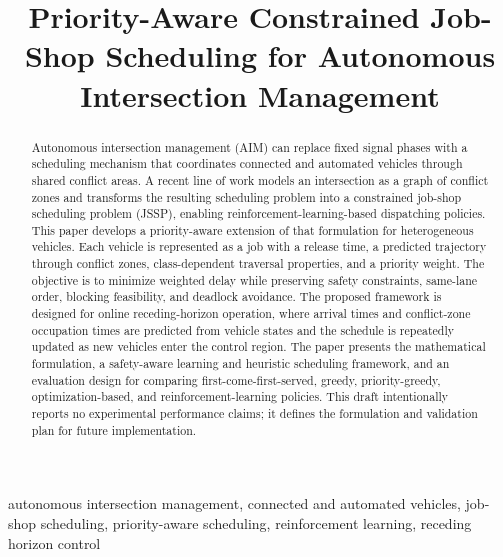 \documentclass[conference]{IEEEtran}
\title{Priority-Aware Constrained Job-Shop Scheduling for Autonomous Intersection Management}
\author{
\IEEEauthorblockN{[Author Name]}
\IEEEauthorblockA{[Institution]\\
Email: [email address]}
}
\begin{document}
\maketitle

\begin{abstract}
Autonomous intersection management (AIM) can replace fixed signal phases with a scheduling mechanism that coordinates connected and automated vehicles through shared conflict areas. A recent line of work models an intersection as a graph of conflict zones and transforms the resulting scheduling problem into a constrained job-shop scheduling problem (JSSP), enabling reinforcement-learning-based dispatching policies. This paper develops a priority-aware extension of that formulation for heterogeneous vehicles. Each vehicle is represented as a job with a release time, a predicted trajectory through conflict zones, class-dependent traversal properties, and a priority weight. The objective is to minimize weighted delay while preserving safety constraints, same-lane order, blocking feasibility, and deadlock avoidance. The proposed framework is designed for online receding-horizon operation, where arrival times and conflict-zone occupation times are predicted from vehicle states and the schedule is repeatedly updated as new vehicles enter the control region. The paper presents the mathematical formulation, a safety-aware learning and heuristic scheduling framework, and an evaluation design for comparing first-come-first-served, greedy, priority-greedy, optimization-based, and reinforcement-learning policies. This draft intentionally reports no experimental performance claims; it defines the formulation and validation plan for future implementation.
\end{abstract}

\begin{IEEEkeywords}
autonomous intersection management, connected and automated vehicles, job-shop scheduling, priority-aware scheduling, reinforcement learning, receding horizon control
\end{IEEEkeywords}












\end{document}
